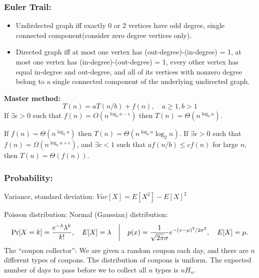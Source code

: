 \documentclass[12pt]{extarticle}
\begin{document}
\begin{multicols*}{2}
			\subsubsection*{Euler Trail:}
			\begin{itemize}
			\itemsep0em 
			\item Undirdected graph iff exactly 0 or 2 vertices have odd degree, single connected component(consider zero degree vertices only).
			\item Directed graph iff at most one vertex has (out-degree)-(in-degree) = 1, at most one vertex has (in-degree)-(out-degree) = 1, every other vertex has equal in-degree and out-degree, and all of its vertices with nonzero degree belong to a single connected component of the underlying undirected graph.
			\end{itemize}

			\par\vskip 3pt
			\textbf{Master method:}
				$$T(n) = aT(n/b) + f(n), \quad a\geq 1, b > 1$$
			If $\exists \epsilon > 0$ such that $f(n) = O(n^{\log_b a - \epsilon})$ then $T(n) = \Theta(n^{\log_b a}).$
			\par
			If $f(n) = \Theta(n^{\log_b a})$ then
			$T(n) = \Theta(n^{\log_b a} \log_2 n).$
			\newline If $\exists \epsilon > 0$ such that $f(n) = \Omega(n^{\log_b a + \epsilon})$,
			and $\exists c < 1$ such that $a f(n/b) \leq cf(n)$ for large $n$,
			then $T(n) = \Theta(f(n)).$
			\par\vskip 3pt
			\subsubsection*{Probability:}
			Variance, standard deviation:
			$Var[X] = E[X^2] - E[X]^2$
			\par\vskip 2pt
			\hspace{1cm} Poisson distribution: \hspace{2cm} Normal (Gaussian) distribution:
			$$
			\Pr[X = k] = {e^{-\lambda} \lambda^k \over k!}, \quad  E[X] = \lambda \quad \bigg| \quad p(x) = {1 \over \sqrt{2 \pi} \sigma} e^{-(x-\mu)^2/2\sigma^2}, \quad E[X] = \mu.
			$$
			The ``coupon collector'':
			We are given a random coupon each day,
			and there are $n$ different types of coupons.
			The distribution of coupons is uniform.
			The expected number of days to pass before we to collect all $n$ types is $n H_n.$
			\par\vskip 2pt

\end{multicols*}
\end{document}
